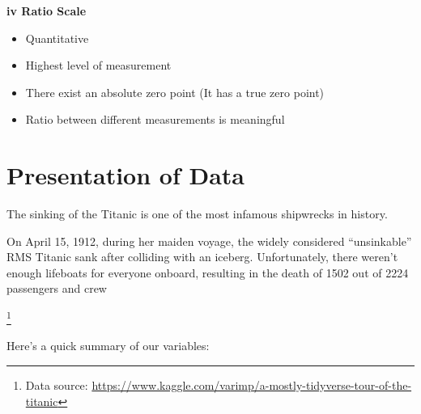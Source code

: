 \documentclass[]{book}
\providecommand{\tightlist}{%
  \setlength{\itemsep}{0pt}\setlength{\parskip}{0pt}}
\begin{document}
\textbf{iv Ratio Scale}

\begin{itemize}
\tightlist
\item
  Quantitative
\item
  Highest level of measurement
\item
  There exist an absolute zero point (It has a true zero point)
\item
  Ratio between different measurements is meaningful
\end{itemize}

\newpage

\hypertarget{presentation-of-data}{%
\section{Presentation of Data}\label{presentation-of-data}}

The sinking of the Titanic is one of the most infamous shipwrecks in history.

On April 15, 1912, during her maiden voyage, the widely considered ``unsinkable'' RMS Titanic sank after colliding with an iceberg. Unfortunately, there weren't enough lifeboats for everyone onboard, resulting in the death of 1502 out of 2224 passengers and crew

\footnote{Data source: \url{https://www.kaggle.com/varimp/a-mostly-tidyverse-tour-of-the-titanic}}

Here's a quick summary of our variables:
\end{document}
